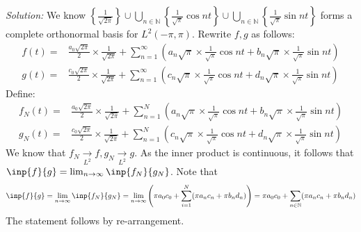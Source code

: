 \documentclass[a4paper, 11pt]{article}
\newenvironment{solution}
    {\textit{Solution:}}
    {}
\begin{document}
\begin{solution}
    We know $\left\{\frac{1}{\sqrt{2\pi}}\right\}\cup\bigcup_{n\in\mathbb N}\left\{\frac{1}{\sqrt\pi}\cos nt\right\}\cup\bigcup_{n\in\mathbb N}\left\{\frac{1}{\sqrt\pi}\sin nt\right\}$ forms a complete orthonormal basis for $L^2(-\pi,\pi)$. Rewrite $f,g$ as follows:
    \begin{align*}
        f(t)=&\frac{a_0\sqrt{2\pi}}{2}\times\frac{1}{\sqrt{2\pi}}+\sum_{n=1}^\infty(a_n\sqrt{\pi}\times\frac{1}{\sqrt{\pi}}\cos nt+b_n\sqrt{\pi}\times\frac{1}{\sqrt{\pi}}\sin nt)\\
        g(t)=&\frac{c_0\sqrt{2\pi}}{2}\times\frac{1}{\sqrt{2\pi}}+\sum_{n=1}^\infty(c_n\sqrt{\pi}\times\frac{1}{\sqrt{\pi}}\cos nt+d_n\sqrt{\pi}\times\frac{1}{\sqrt{\pi}}\sin nt)
    \end{align*}
    Define:
    \begin{align*}
        f_N(t)=&\frac{a_0\sqrt{2\pi}}{2}\times\frac{1}{\sqrt{2\pi}}+\sum_{n=1}^N(a_n\sqrt{\pi}\times\frac{1}{\sqrt{\pi}}\cos nt+b_n\sqrt{\pi}\times\frac{1}{\sqrt{\pi}}\sin nt)\\
        g_N(t)=&\frac{c_0\sqrt{2\pi}}{2}\times\frac{1}{\sqrt{2\pi}}+\sum_{n=1}^N(c_n\sqrt{\pi}\times\frac{1}{\sqrt{\pi}}\cos nt+d_n\sqrt{\pi}\times\frac{1}{\sqrt{\pi}}\sin nt)
    \end{align*}
    We know that $f_N\xrightarrow[L^2]{}f,g_N\xrightarrow[L^2]{}g$. As the inner product is continuous, it follows that $\inp{f}{g}=\lim_{n\to\infty}\inp{f_N}{g_N}$. Note that
    $$\inp{f}{g}=\lim_{n\to\infty}\inp{f_N}{g_N}=\lim_{n\to\infty}\left(\pi a_0c_0+\sum_{i=1}^N(\pi a_nc_n+\pi b_nd_n)\right)=\pi a_0c_0+\sum_{n\in\mathbb N}(\pi a_nc_n+\pi b_nd_n)$$
    The statement follows by re-arrangement. 
\end{solution}
\end{document}
